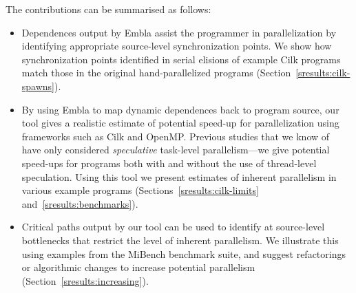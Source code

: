 The contributions can be summarised as follows:
\begin{itemize}
\item
Dependences output by Embla assist the programmer in 
parallelization by identifying
appropriate source-level synchronization points. We show how synchronization
points identified in serial elisions of example Cilk programs
match those in the original hand-parallelized programs (Section~\ref{sresults:cilk-spawns}).
\item
By using Embla to map dynamic dependences back to program source,
our tool gives a realistic estimate of potential speed-up for
parallelization using frameworks such as Cilk and OpenMP.
Previous studies that we know of~\cite{Kreaseck00limitsof,warg01limits,oplinger99insearch}
have only considered \emph{speculative}
task-level parallelism---we give potential speed-ups for programs
both with and without the use of thread-level speculation.
Using this tool we present estimates of inherent parallelism in
various example programs (Sections~\ref{sresults:cilk-limits} and~\ref{sresults:benchmarks}).
\item
Critical paths output by our tool can
be used to identify at source-level bottlenecks that restrict the level of
inherent parallelism. We illustrate this using examples
from the MiBench benchmark suite, and suggest refactorings
or algorithmic changes to increase potential parallelism (Section~\ref{sresults:increasing}).
\end{itemize}
